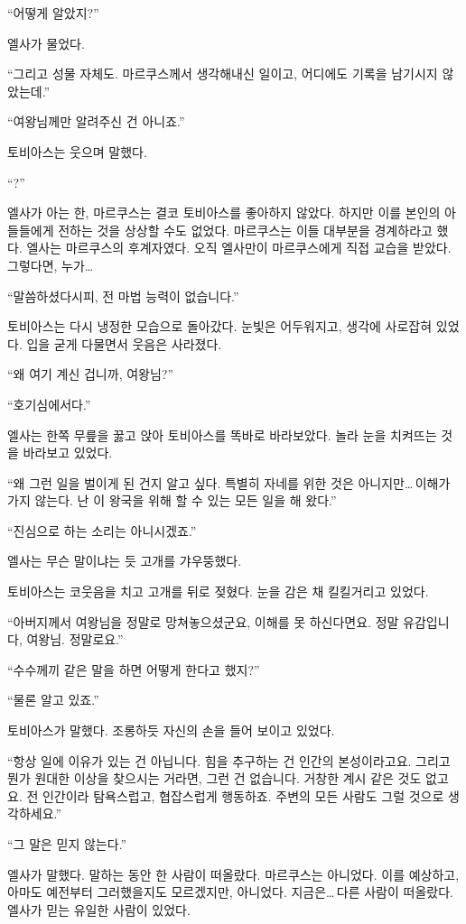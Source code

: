 ``어떻게 알았지?''

엘사가 물었다.

``그리고 성물 자체도. 마르쿠스께서 생각해내신 일이고, 어디에도 기록을 남기시지 않았는데.''

``여왕님께만 알려주신 건 아니죠.''

토비아스는 웃으며 말했다.

``?''

엘사가 아는 한, 마르쿠스는 결코 토비아스를 좋아하지 않았다. 하지만 이를 본인의 아들들에게 전하는 것을 상상할 수도 없었다. 마르쿠스는 이들 대부분을 경계하라고 했다. 엘사는 마르쿠스의 후계자였다. 오직 엘사만이 마르쿠스에게 직접 교습을 받았다. 그렇다면, 누가\ldots

``말씀하셨다시피, 전 마법 능력이 없습니다.''

토비아스는 다시 냉정한 모습으로 돌아갔다. 눈빛은 어두워지고, 생각에 사로잡혀 있었다. 입을 굳게 다물면서 웃음은 사라졌다.

``왜 여기 계신 겁니까, 여왕님?''

``호기심에서다.''

엘사는 한쪽 무릎을 꿇고 앉아 토비아스를 똑바로 바라보았다. 놀라 눈을 치켜뜨는 것을 바라보고 있었다.

``왜 그런 일을 벌이게 된 건지 알고 싶다. 특별히 자네를 위한 것은 아니지만\ldots\,이해가 가지 않는다. 난 이 왕국을 위해 할 수 있는 모든 일을 해 왔다.''

``진심으로 하는 소리는 아니시겠죠.''

엘사는 무슨 말이냐는 듯 고개를 갸우뚱했다.

토비아스는 코웃음을 치고 고개를 뒤로 젖혔다. 눈을 감은 채 킬킬거리고 있었다.

``아버지께서 여왕님을 정말로 망쳐놓으셨군요, 이해를 못 하신다면요. 정말 유감입니다, 여왕님. 정말로요.''

``수수께끼 같은 말을 하면 어떻게 한다고 했지?''

``물론 알고 있죠.''

토비아스가 말했다. 조롱하듯 자신의 손을 들어 보이고 있었다.

``항상 일에 이유가 있는 건 아닙니다. 힘을 추구하는 건 인간의 본성이라고요. 그리고 뭔가 원대한 이상을 찾으시는 거라면, 그런 건 없습니다. 거창한 계시 같은 것도 없고요. 전 인간이라 탐욕스럽고, 협잡스럽게 행동하죠. 주변의 모든 사람도 그럴 것으로 생각하세요.''

``그 말은 믿지 않는다.''

엘사가 말했다. 말하는 동안 한 사람이 떠올랐다. 마르쿠스는 아니었다. 이를 예상하고, 아마도 예전부터 그러했을지도 모르겠지만, 아니었다. 지금은\ldots\,다른 사람이 떠올랐다. 엘사가 믿는 유일한 사람이 있었다.

